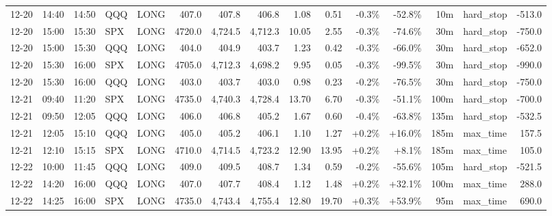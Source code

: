 \documentclass[11pt,a4paper,twoside]{article}
\begin{document}
\begin{landscape}
\begin{center}
\begin{longtable}{>{\color{txtmain}}l l l l l r r r r r r r r >{\color{txtmain}}l r}
12-20 & 14:40 & 14:50 & QQQ & LONG & 407.0 & 407.8 & 406.8 & 1.08 & 0.51 & \textcolor{lossred}{-0.3\%} & \textcolor{lossred}{-52.8\%} & 10m & hard\_stop & \textcolor{lossred}{-513.0} \\
12-20 & 15:00 & 15:30 & SPX & LONG & 4720.0 & 4,724.5 & 4,712.3 & 10.05 & 2.55 & \textcolor{lossred}{-0.3\%} & \textcolor{lossred}{-74.6\%} & 30m & hard\_stop & \textcolor{lossred}{-750.0} \\
12-20 & 15:00 & 15:30 & QQQ & LONG & 404.0 & 404.9 & 403.7 & 1.23 & 0.42 & \textcolor{lossred}{-0.3\%} & \textcolor{lossred}{-66.0\%} & 30m & hard\_stop & \textcolor{lossred}{-652.0} \\
12-20 & 15:30 & 16:00 & SPX & LONG & 4705.0 & 4,712.3 & 4,698.2 & 9.95 & 0.05 & \textcolor{lossred}{-0.3\%} & \textcolor{lossred}{-99.5\%} & 30m & hard\_stop & \textcolor{lossred}{-990.0} \\
12-20 & 15:30 & 16:00 & QQQ & LONG & 403.0 & 403.7 & 403.0 & 0.98 & 0.23 & \textcolor{lossred}{-0.2\%} & \textcolor{lossred}{-76.5\%} & 30m & hard\_stop & \textcolor{lossred}{-750.0} \\
12-21 & 09:40 & 11:20 & SPX & LONG & 4735.0 & 4,740.3 & 4,728.4 & 13.70 & 6.70 & \textcolor{lossred}{-0.3\%} & \textcolor{lossred}{-51.1\%} & 100m & hard\_stop & \textcolor{lossred}{-700.0} \\
12-21 & 09:50 & 12:05 & QQQ & LONG & 406.0 & 406.8 & 405.2 & 1.67 & 0.60 & \textcolor{lossred}{-0.4\%} & \textcolor{lossred}{-63.8\%} & 135m & hard\_stop & \textcolor{lossred}{-532.5} \\
12-21 & 12:05 & 15:10 & QQQ & LONG & 405.0 & 405.2 & 406.1 & 1.10 & 1.27 & \textcolor{wingreen}{+0.2\%} & \textcolor{wingreen}{+16.0\%} & 185m & max\_time & \textcolor{wingreen}{157.5} \\
12-21 & 12:10 & 15:15 & SPX & LONG & 4710.0 & 4,714.5 & 4,723.2 & 12.90 & 13.95 & \textcolor{wingreen}{+0.2\%} & \textcolor{wingreen}{+8.1\%} & 185m & max\_time & \textcolor{wingreen}{105.0} \\
12-22 & 10:00 & 11:45 & QQQ & LONG & 409.0 & 409.5 & 408.7 & 1.34 & 0.59 & \textcolor{lossred}{-0.2\%} & \textcolor{lossred}{-55.6\%} & 105m & hard\_stop & \textcolor{lossred}{-521.5} \\
12-22 & 14:20 & 16:00 & QQQ & LONG & 407.0 & 407.7 & 408.4 & 1.12 & 1.48 & \textcolor{wingreen}{+0.2\%} & \textcolor{wingreen}{+32.1\%} & 100m & max\_time & \textcolor{wingreen}{288.0} \\
12-22 & 14:25 & 16:00 & SPX & LONG & 4735.0 & 4,743.4 & 4,755.4 & 12.80 & 19.70 & \textcolor{wingreen}{+0.3\%} & \textcolor{wingreen}{+53.9\%} & 95m & max\_time & \textcolor{wingreen}{690.0} \\

\end{longtable}
\end{center}
\end{landscape}
\end{document}
